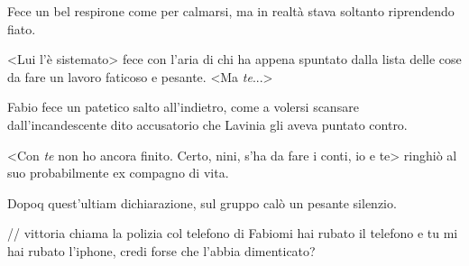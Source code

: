Fece un bel respirone come per calmarsi, ma in realtà stava soltanto riprendendo fiato.

<Lui l'è sistemato> fece con l'aria di chi ha appena spuntato dalla lista delle cose da fare un lavoro faticoso e pesante. <Ma \emph{te}...>

Fabio fece un patetico salto all'indietro, come a volersi scansare dall'incandescente dito accusatorio che Lavinia gli aveva puntato contro.

<Con \emph{te} non ho ancora finito. Certo, nini, s'ha da fare i conti, io e te> ringhiò al suo probabilmente ex compagno di vita.

Dopoq quest'ultiam dichiarazione, sul gruppo calò un pesante silenzio.

// vittoria chiama la polizia col telefono di Fabiomi hai rubato il telefono
e tu mi hai rubato l'iphone, credi forse che l'abbia dimenticato?